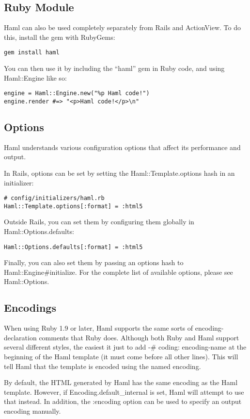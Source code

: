 \documentclass[9pt]{article}
\begin{document}
\subsection{Ruby Module}


 Haml can also be used completely separately from Rails and ActionView. To do this, install the gem with RubyGems:
\begin{verbatim}
gem install haml
\end{verbatim}


 You can then use it by including the “haml” gem in Ruby code, and using Haml::Engine like so:
\begin{verbatim}
engine = Haml::Engine.new("%p Haml code!")
engine.render #=> "<p>Haml code!</p>\n"
\end{verbatim}
\subsection{Options}


 Haml understands various configuration options that affect its performance and output.


 In Rails, options can be set by setting the Haml::Template.options hash in an initializer:
\begin{verbatim}
# config/initializers/haml.rb
Haml::Template.options[:format] = :html5
\end{verbatim}


 Outside Rails, you can set them by configuring them globally in Haml::Options.defaults:
\begin{verbatim}
Haml::Options.defaults[:format] = :html5
\end{verbatim}


 Finally, you can also set them by passing an options hash to Haml::Engine\#initialize. For the complete list of available options, please see Haml::Options.
\subsection{Encodings}


 When using Ruby 1.9 or later, Haml supports the same sorts of encoding-declaration comments that Ruby does. Although both Ruby and Haml support several different styles, the easiest it just to add -\# coding: encoding-name at the beginning of the Haml template (it must come before all other lines). This will tell Haml that the template is encoded using the named encoding.


 By default, the HTML generated by Haml has the same encoding as the Haml template. However, if Encoding.default\_internal is set, Haml will attempt to use that instead. In addition, the :encoding option can be used to specify an output encoding manually.
\end{document}
